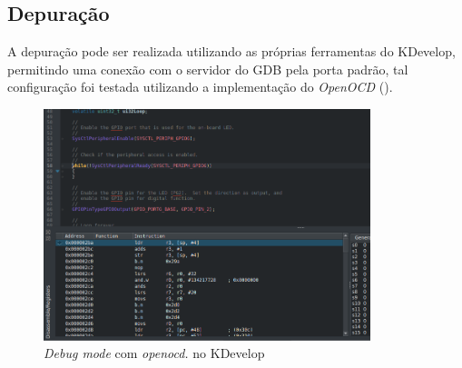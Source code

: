 \subsection{Depuração}

A depuração pode ser realizada utilizando as próprias ferramentas do KDevelop, permitindo uma conexão com o servidor do GDB pela porta padrão, tal configuração foi testada utilizando a implementação do \textit{OpenOCD} ().

\begin{figure}[!htb]
  \centering
  \includegraphics[width=0.85\textwidth]{figuras/DEBUG.png}
  \caption[\textit{Debug mode} com \textit{openocd} no KDevelop]{\textit{Debug mode} com \textit{openocd.} no KDevelop}
  \label{fig:openocddebug}
\end{figure}
